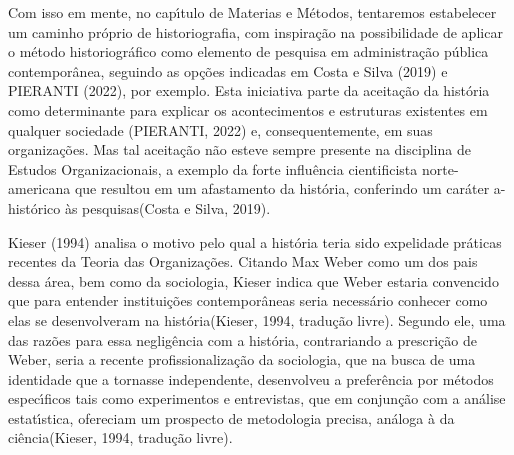 \documentclass[
12pt,		%
openright,	%
twoside,  %
a4paper,			%
chapter=TITLE,		%
english,			%
french,				%
spanish,			%
brazil				%
]{USPSC-classe/USPSC}
\begin{document}
\noindent\begin{center}\mbox{\centering{}}\end{center}


Com isso em mente, no cap\'{\i}tulo de Materias e M\'etodos, tentaremos estabelecer um caminho pr\'oprio de historiografia, com inspira\c{c}\~ao na possibilidade de aplicar o m\'etodo historiogr\'afico como elemento de pesquisa em administra\c{c}\~ao p\'ublica contempor\^anea, seguindo as op\c{c}\~oes indicadas em   Costa e Silva (2019) e PIERANTI (2022), por exemplo. Esta iniciativa parte da aceita\c{c}\~ao da hist\'oria como determinante para explicar os acontecimentos e estruturas existentes em qualquer sociedade (PIERANTI, 2022) e, consequentemente, em suas organiza\c{c}\~oes. Mas tal aceita\c{c}\~ao n\~ao esteve sempre presente na disciplina de Estudos Organizacionais, a exemplo da \textquotedbl forte influ\^encia cientificista norte-americana que resultou em um afastamento da hist\'oria, conferindo um car\'ater a-hist\'orico \`as pesquisas\textquotedbl   (Costa e Silva, 2019).










 Kieser (1994)  analisa o motivo pelo qual a hist\'oria teria sido \textquotedbl expelida\textquotedbl  de pr\'aticas recentes da Teoria das Organiza\c{c}\~oes. Citando Max Weber como um dos pais dessa \'area, bem como da sociologia, Kieser indica que Weber estaria \textquotedbl convencido que para entender institui\c{c}\~oes contempor\^aneas seria necess\'ario conhecer como elas se desenvolveram na hist\'oria\textquotedbl   (Kieser, 1994, tradu\c{c}\~ao livre). Segundo ele, uma das raz\~oes para essa neglig\^encia com a hist\'oria, contrariando a prescri\c{c}\~ao de Weber, seria a recente profissionaliza\c{c}\~ao da sociologia, que na busca de uma identidade que a tornasse independente, desenvolveu a prefer\^encia por m\'etodos espec\'{\i}ficos tais como experimentos e entrevistas, que \textquotedbl em conjun\c{c}\~ao com a an\'alise estat\'{\i}stica, ofereciam um prospecto de metodologia precisa, an\'aloga \`a da ci\^encia\textquotedbl   (Kieser, 1994, tradu\c{c}\~ao livre).
\end{document}

